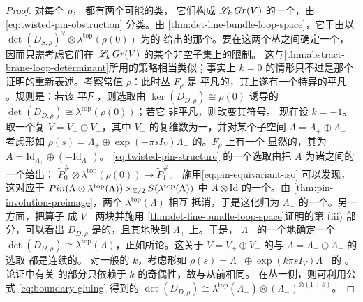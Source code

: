 \begin{proof}
对每个 $\rho$，\trTwisted{} \trPinStructure{}都有两个可能的\trIsomorphism{}类，
它们构成 $\mathscr{L}_k\,Gr(V)$ 的一个\trDoubleCover，由
\eqref{eq:twisted-pin-obstruction} 分类。由
\cref{thm:det-line-bundle-loop-space}，它\trIsomorphic{}于由以
$\det(D_{S,\rho})^\vee\otimes\lambda^{\mathrm{top}}(\rho(0))$ 为\trFiber{}的%
\trLineBundle{}给出的那个\trCovering。要在这两个丛之间确定一个\trIsomorphism，
因而只需考虑它们在 $\mathscr{L}_k\,Gr(V)$ 的某个非空\trConnected{}子集上的限制。
这与\cref{thm:abstract-brane-loop-determinant}所用的策略相当类似；事实上 $k=0$
的情形只不过是那个证明的重新表述。考察常值\trLoop{} $\rho$：此时丛 $F_\rho$ 是
平凡的，其上遂有一个特异的平凡 \trPinStructure。规则是：若该%
\trPinStructure{}平凡，则选取由 $\ker(D_{D,\rho})\cong\rho(0)$ 诱导的%
\trIsomorphism{} $\det(D_{D,\rho})\cong\lambda^{\mathrm{top}}(\rho(0))$；若它
非平凡，则改变其符号。
现在设 $k=-1$。取一个\trOrthogonal{}复\trSplitting{} $V=V_+\oplus V_-$，其中
$V_-$ 的复维数为一，并对某个\trSplitting\trLagrange{}子空间
$\Lambda=\Lambda_+\oplus\Lambda_-$ 考虑形如
$\rho(s)=\Lambda_+\oplus\exp(-\pi s I_V)\Lambda_-$ 的\trLoop{}。$F_\rho$ 上有一个
显然的\trConnection，其\trMonodromy{}为
$A=\mathrm{Id}_{\Lambda_+}\oplus(-\mathrm{Id}_{\Lambda_-})$。\trTwisted{}
\trPinStructure{} \eqref{eq:twisted-pin-structure} 的一个选取由把 $A$
\trLift{}为诸\trPinStructure{}之间的一个\trIsomorphism{}给出：
$\widetilde{P}_0^\#\otimes\lambda^{\mathrm{top}}(\rho(0))\to\widetilde{P}_1^\#$。
施用\eqref{eq:pin-equivariant-iso} 可以发现，这对应于
$Pin(\Lambda\otimes\lambda^{\mathrm{top}}(\Lambda))\times_{\mathbb{Z}/2}
S(\lambda^{\mathrm{top}}(\Lambda))$ 中 $A\otimes\mathrm{Id}$ 的一个\trPreimage。由
\cref{thm:pin-involution-preimage}，两个 $\lambda^{\mathrm{top}}(\Lambda)$ 相互
抵消，于是这化归为 $\Lambda_-$ 的一个\trOrientation。另一方面，把算子%
\trSplitting{}成 $V_\pm$ 两块并施用
\cref{thm:det-line-bundle-loop-space}证明的第 (iii) 部分，可以看出 $D_{D,\rho}$
是\trSurjective{}的，且其\trKernel{}\trIsomorphic{}地映到 $\Lambda_+$ 上。于是，
$\Lambda_-$ 的一个\trOrientation{}\trCanonical{}地确定一个\trIsomorphism{}
$\det(D_{D,\rho})\cong\lambda^{\mathrm{top}}(\Lambda)$，正如所论。这关于
$V=V_+\oplus V_-$ 的\trSplitting{}与 $\Lambda=\Lambda_+\oplus\Lambda_-$ 的选取
都是连续的。
对一般的 $k$，考虑形如 $\rho(s)=\Lambda_+\oplus\exp(k\pi s I_V)\Lambda_-$ 的%
\trLoop{}。论证中有关 \trPinStructure{}的部分只依赖于 $k$ 的奇偶性，故与从前相同。
在\trDeterminantLine{}丛一侧，则可利用\trGluing{}公式
\eqref{eq:boundary-gluing} 得到\trCanonical{}的\trIsomorphism{}
$\det(D_{D,\rho})\cong\lambda^{\mathrm{top}}(\Lambda_+)\otimes
(\Lambda_-)^{\otimes(1+k)}$。
\end{proof}

